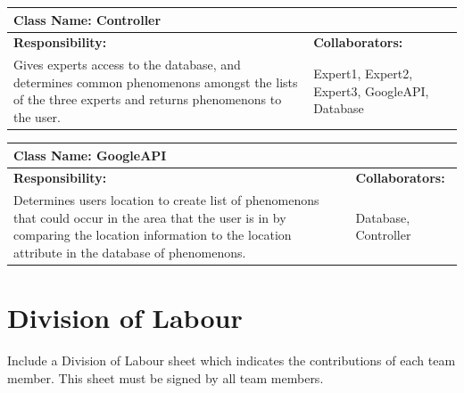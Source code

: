 \documentclass[]{article}
\begin{document}
	\begin{table}[ht]
		\centering
		\begin{tabular}{|p{5cm}|p{5cm}|}
		\hline 
		 \multicolumn{2}{|l|}{\textbf{Class Name: Controller}} \\
		\hline
		\textbf{Responsibility:} & \textbf{Collaborators:} \\
		\hline
		Gives experts access to the database, and determines common phenomenons amongst the lists of the three experts and returns phenomenons to the user. \vspace{1in} & Expert1, Expert2, Expert3, GoogleAPI, Database\\
		\hline
		\end{tabular}
	\end{table}
	\begin{table}[ht]
		\centering
		\begin{tabular}{|p{5cm}|p{5cm}|}
		\hline 
		 \multicolumn{2}{|l|}{\textbf{Class Name: GoogleAPI}} \\
		\hline
		\textbf{Responsibility:} & \textbf{Collaborators:} \\
		\hline
		Determines users location to create list of phenomenons that could occur in the area that the user is in by comparing the location information to the location attribute in the database of phenomenons.\vspace{1in} & Database, Controller\\
		\hline
		\end{tabular}
	\end{table}

\appendix
\section{Division of Labour}
\label{sec:division_of_labour}
Include a Division of Labour sheet which indicates the contributions of each team member. This sheet must be signed by all team members.

\newpage
\end{document}
